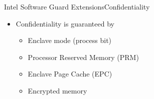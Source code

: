 \documentclass{beamer}
\begin{document}
\begin{frame}{Intel Software Guard Extensions}{Confidentiality}
    \begin{itemize}
    	\item Confidentiality is guaranteed by

			\vfill
  			
    	\begin{itemize}
    		\item Enclave mode (process bit)

  			\vfill
  			
    		\item Processor Reserved Memory (PRM)

  			\vfill
  			
    		\item Enclave Page Cache (EPC)

  			\vfill

    		\item Encrypted memory
    	\end{itemize}
    \end{itemize}
\end{frame}

    
\end{document}
